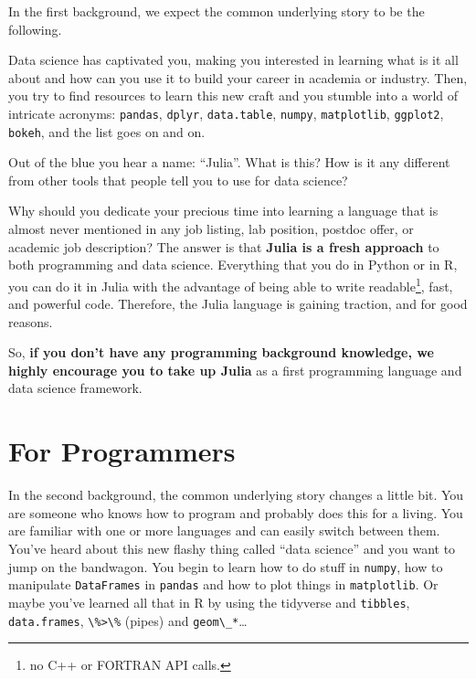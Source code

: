 \documentclass[
  notoc %
]{tufte-book}
\newcommand{\passthrough}[1]{#1}
\begin{document}
In the first background, we expect the common underlying story to be the
following.

Data science has captivated you, making you interested in learning what
is it all about and how can you use it to build your career in academia
or industry. Then, you try to find resources to learn this new craft and
you stumble into a world of intricate acronyms:
\passthrough{\lstinline!pandas!}, \passthrough{\lstinline!dplyr!},
\passthrough{\lstinline!data.table!}, \passthrough{\lstinline!numpy!},
\passthrough{\lstinline!matplotlib!}, \passthrough{\lstinline!ggplot2!},
\passthrough{\lstinline!bokeh!}, and the list goes on and on.

Out of the blue you hear a name: ``Julia''. What is this? How is it any
different from other tools that people tell you to use for data science?

Why should you dedicate your precious time into learning a language that
is almost never mentioned in any job listing, lab position, postdoc
offer, or academic job description? The answer is that \textbf{Julia is
a fresh approach} to both programming and data science. Everything that
you do in Python or in R, you can do it in Julia with the advantage of
being able to write readable\footnote{no C++ or FORTRAN API calls.},
fast, and powerful code. Therefore, the Julia language is gaining
traction, and for good reasons.

So, \textbf{if you don't have any programming background knowledge, we
highly encourage you to take up Julia} as a first programming language
and data science framework.

\hypertarget{sec:programmers}{%
\section{For Programmers}\label{sec:programmers}}

In the second background, the common underlying story changes a little
bit. You are someone who knows how to program and probably does this for
a living. You are familiar with one or more languages and can easily
switch between them. You've heard about this new flashy thing called
``data science'' and you want to jump on the bandwagon. You begin to
learn how to do stuff in \passthrough{\lstinline!numpy!}, how to
manipulate \passthrough{\lstinline!DataFrames!} in
\passthrough{\lstinline!pandas!} and how to plot things in
\passthrough{\lstinline!matplotlib!}. Or maybe you've learned all that
in R by using the tidyverse and \passthrough{\lstinline!tibbles!},
\passthrough{\lstinline!data.frames!}, \passthrough{\lstinline!\%>\%!}
(pipes) and \passthrough{\lstinline!geom\_*!}\ldots{}
\end{document}
